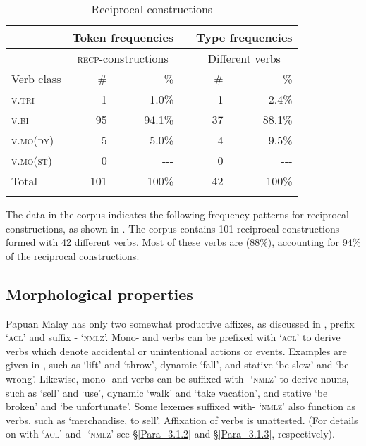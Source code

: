 \begin{table}
\caption{Reciprocal constructions}\label{Table_5.20}

\begin{tabular}{l*{5}{r}}
\lsptoprule


 & \multicolumn{2}{c}{ Token frequencies} & &  \multicolumn{2}{c}{ Type frequencies}\\
 \midrule
 & \multicolumn{2}{c}{ \textsc{recp}{}-constructions} &  & \multicolumn{2}{c}{ Different verbs}\\
Verb class &  \# &  \%  & &  \# &  \%\\
\textsc{v.tri} &  1 &  1.0\% & &   1 &  2.4\%\\
\textsc{v.bi} &  95 &  94.1\% & &   37 &  88.1\%\\
\textsc{v.mo}(\textsc{dy}) &  5 &  5.0\% &  &  4 &  9.5\%\\
\textsc{v.mo}(\textsc{st}) &  0 &  {}-{}-{}- & &   0 &  {}-{}-{}-\\
\midrule
Total &  101 &  100\% & &   42 &  100\%\\
\lspbottomrule
\end{tabular}
\end{table}


The data in the corpus indicates the following frequency patterns for reciprocal constructions, as shown in . The corpus contains 101 reciprocal constructions formed with 42 different verbs. Most of these verbs are  (88\%), accounting for 94\% of the reciprocal constructions.

\subsection{Morphological properties}\label{Para_5.3.9}

Papuan Malay has only two somewhat productive affixes, as discussed in , prefix  ‘\textsc{acl}’ and suffix - ‘\textsc{nmlz}’. Mono- and  verbs can be prefixed with  ‘\textsc{acl}’ to derive verbs which denote accidental or unintentional actions or events. Examples are given in , such as   ‘lift’ and  ‘throw’,  dynamic  ‘fall’, and stative  ‘be slow’ and  ‘be wrong’. Likewise, mono- and  verbs can be suffixed with- ‘\textsc{nmlz}’ to derive nouns, such as   ‘sell’ and  ‘use’,  dynamic  ‘walk’ and  ‘take vacation’, and stative  ‘be broken’ and  ‘be unfortunate’. Some lexemes suffixed with- ‘\textsc{nmlz}’ also function as verbs, such as  ‘merchandise, to sell’. Affixation of  verbs is unattested. (For details on  with  ‘\textsc{acl}’ and- ‘\textsc{nmlz}’ see §\ref{Para_3.1.2} and §\ref{Para_3.1.3}, respectively).


